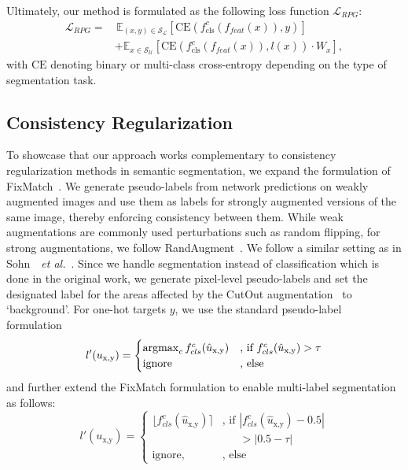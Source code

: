 \documentclass[letterpaper]{article} %
\def\argmax{\mathop{\rm argmax}}
\newcommand{\etal}{~\emph{et al.}}
\begin{document}
Ultimately, our method is formulated as the following loss function $\mathcal{L}_{RPG}$:
\begin{align}
    \mathcal{L}_{RPG} = &
    \, \mathbb{E}_{(x,y)\in \mathcal{S}_\mathcal{L}} 
    [\mathrm{CE}(f_{\text{cls}}^c(f_{feat}(x)),y) ]
    \nonumber\\ \quad
    & +
    \mathbb{E}_{x\in \mathcal{S}_\mathcal{U}} 
    [\mathrm{CE}(f_{\text{cls}}^c(f_{feat}(x)),l(x)) \cdot W_{x}],
\end{align}
with $\mathrm{CE}$ denoting binary or multi-class cross-entropy depending on the type of segmentation task.

\subsection{Consistency Regularization}
To showcase that our approach works complementary to consistency regularization methods in semantic segmentation, we expand the formulation of FixMatch~\cite{sohn2020fixmatch}.
We generate pseudo-labels from network predictions on weakly augmented images and use them as labels for strongly augmented versions of the same image, thereby enforcing consistency between them. %
While weak augmentations are commonly used perturbations such as random flipping, for strong augmentations, we follow RandAugment~\cite{cubuk2020randaugment}.
We follow a similar setting as in Sohn~\etal~\cite{sohn2020fixmatch}.
Since we handle segmentation instead of classification which is done in the original work, we generate pixel-level pseudo-labels and set the designated label for the areas affected by the CutOut augmentation~\cite{devries2017improved} to `background'. 
For one-hot targets $y$, we use the standard pseudo-label formulation~\cite{sohn2020fixmatch}
\begin{equation}\label{eq:multi-class}
    l'( u_{\text{x},\text{y}}) = 
    \begin{cases}
        \argmax_{c} f_{cls}^c(\hat u_{\text{x},\text{y}})       &         \text{, if } f_{cls}^c(\hat  u_{\text{x,y}})>\tau
    \\
    \text{ignore} & \text{, else}
    \end{cases}
\end{equation}
and further extend the FixMatch formulation to enable multi-label segmentation as follows:
\begin{equation}\label{eq:multi-label}
    l'( u_{\text{x},\text{y}}) = 
    \begin{cases}
        \lfloor f_{cls}^c(\hat u_{\text{x},\text{y}}) \rceil 
         & \text{, if } |f_{cls}^c(\hat  u_{\text{x},\text{y}}) - 0.5 | \\ & \quad \;\; > |0.5 - \tau|
    \\
    \text{ignore} ,& \text{, else}
    \end{cases}
\end{equation}
\end{document}
